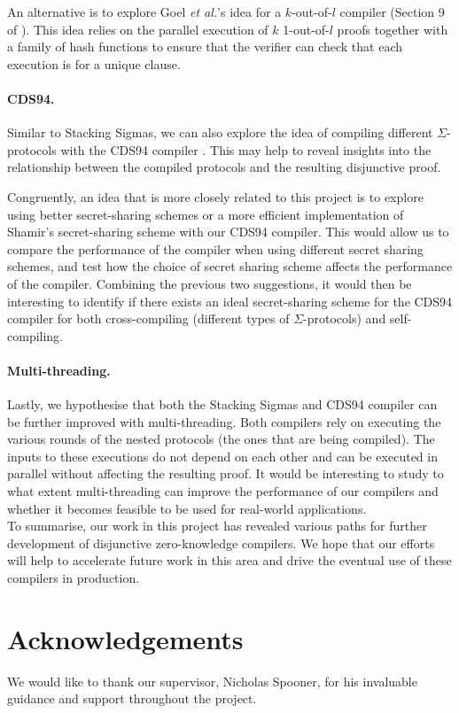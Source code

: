 An alternative is to explore Goel {\em et al.}'s idea for a $k$-out-of-$l$ compiler (Section 9 of \cite{StackingSigmas}).
This idea relies on the parallel execution of $k$ 1-out-of-$l$ proofs together with a family of hash functions to 
ensure that the verifier can check that each execution is for a unique clause. 

\paragraph{CDS94.} Similar to Stacking Sigmas, we can also explore the idea of compiling different $\Sigma$-protocols with the CDS94 compiler \cite{CDS94}. This may help to reveal insights into the relationship between the compiled protocols and the resulting disjunctive proof. 

Congruently, an idea that is more closely related to this project is to explore using better secret-sharing schemes or a more efficient implementation of Shamir's secret-sharing scheme with our CDS94 compiler. This would allow us to compare the performance of
the compiler when using different secret sharing schemes, and test how the choice of secret sharing scheme affects the performance of the compiler. Combining the previous two suggestions, it would then be interesting to identify if there exists an ideal secret-sharing scheme for the CDS94 compiler for both cross-compiling (different types of $\Sigma$-protocols) and self-compiling.

\paragraph{Multi-threading.} Lastly, we hypothesise that both the Stacking Sigmas and CDS94 compiler can be further improved with multi-threading. Both compilers rely on executing the various rounds of the nested protocols (the ones that are being compiled). The inputs to these executions do not depend on each other and can be executed in parallel without affecting the resulting proof. It would be interesting to study to what extent multi-threading can improve the performance of our compilers and whether it becomes feasible to be used for real-world applications. \\ 

To summarise, our work in this project has revealed various paths for further development of disjunctive zero-knowledge compilers. We hope that our efforts will help to accelerate future work in this area and drive the eventual use of these compilers in production.

\section*{Acknowledgements}
\label{sec:acknowledgements}
We would like to thank our supervisor, Nicholas Spooner, for his invaluable guidance and support throughout the project.

